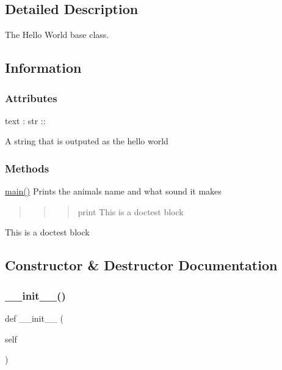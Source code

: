\subsection{Detailed Description}
The Hello World base class. 

\subsection*{Information }

\subsubsection*{Attributes }

text \+: str \+:\+: \begin{DoxyVerb}A string that is outputed as the hello world
\end{DoxyVerb}


\subsubsection*{Methods }

\hyperlink{classpipver_1_1helloworld_1_1HelloWorld_a7e1501a70203cec5b3c885a2c87ae98c}{main()} Prints the animals name and what sound it makes

\begin{quote}
\begin{quote}
\begin{quote}
print \textquotesingle{}This is a doctest block\textquotesingle{} \end{quote}
\end{quote}
\end{quote}
This is a doctest block 

\subsection{Constructor \& Destructor Documentation}
\mbox{\label{classpipver_1_1helloworld_1_1HelloWorld_ae64f0875afe3067b97ba370b354b9213}} 
\subsubsection{\texorpdfstring{\+\_\+\+\_\+init\+\_\+\+\_\+()}{\_\_init\_\_()}\hspace{0.1cm}{\footnotesize\ttfamily [1/2]}}
{\footnotesize\ttfamily def \+\_\+\+\_\+init\+\_\+\+\_\+ (\begin{DoxyParamCaption}\item[{}]{self }\end{DoxyParamCaption})}



